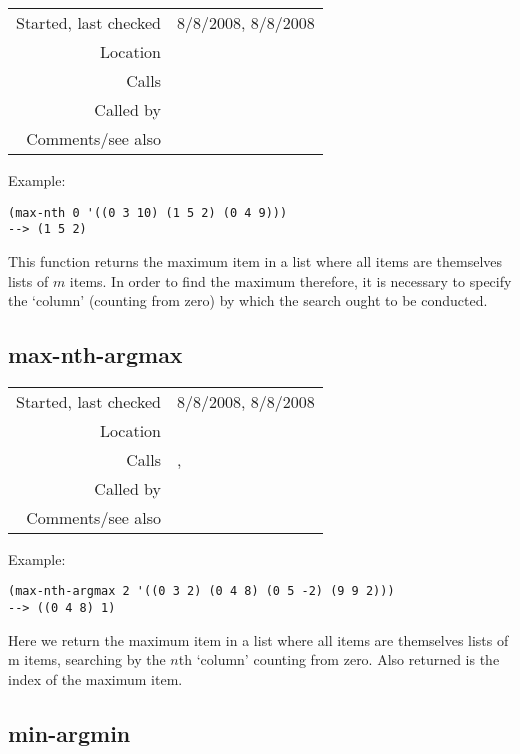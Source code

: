 \vspace{0.3cm}
\begin{tabular}{r|p{8cm}}
Started, last checked & 8/8/2008, 8/8/2008 \\
Location & \nameref{sec:sort-by} \\
Calls & \\
Called by & \nameref{fun:max-nth-argmax} \\
Comments/see also & \nameref{fun:min-nth}
\end{tabular}

\vspace{0.5cm}
\noindent Example:
\begin{verbatim}
(max-nth 0 '((0 3 10) (1 5 2) (0 4 9)))
--> (1 5 2)
\end{verbatim}

\noindent This function returns the maximum item in a
list where all items are themselves lists of $m$
items. In order to find the maximum therefore, it is
necessary to specify the `column' (counting from zero)
by which the search ought to be conducted.


\subsection*{max-nth-argmax}\label{fun:max-nth-argmax}

\vspace{0.3cm}
\begin{tabular}{r|p{8cm}}
Started, last checked & 8/8/2008, 8/8/2008 \\
Location & \nameref{sec:sort-by} \\
Calls & \nameref{fun:index-item-1st-occurs}, \nameref{fun:max-nth} \\
Called by & \\
Comments/see also & \nameref{fun:min-nth-argmin}
\end{tabular}

\vspace{0.5cm}
\noindent Example:
\begin{verbatim}
(max-nth-argmax 2 '((0 3 2) (0 4 8) (0 5 -2) (9 9 2)))
--> ((0 4 8) 1)
\end{verbatim}

\noindent Here we return the maximum item in a list
where all items are themselves lists of m items,
searching by the $n$th `column' counting from zero.
Also returned is the index of the maximum item.


\subsection*{min-argmin}\label{fun:min-argmin}

